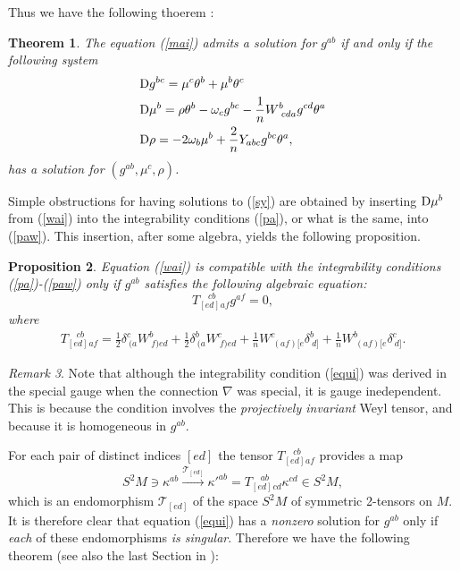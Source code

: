 \documentclass[letterpaper]{amsart}
\newtheorem{theorem}{Theorem}[section]
\newtheorem{proposition}[theorem]{Proposition}
\theoremstyle{definition}
\theoremstyle{remark}
\newtheorem{remark}[theorem]{Remark}
\newcommand{\be}{\begin{equation}}
\newcommand{\ee}{\end{equation}}
\newcommand{\D}{{\rm D}}
\begin{document}
Thus we have the following thoerem \cite{ema}:
\begin{theorem}\label{sto}
The equation (\ref{mai}) admits a solution for $g^{ab}$ if and
only if the following system
\be\begin{aligned}
&\D g^{bc}=\mu^c\theta^b+\mu^b\theta^c\\
&\D\mu^b=\rho\theta^b-\omega_cg^{bc}-\frac{1}{n}W^b_{~cda}g^{cd}\theta^a\\
&\D\rho=-2\omega_b\mu^b+\frac{2}{n}Y_{abc}g^{bc}\theta^a,
\end{aligned}\label{sy}
\ee
has a solution for $(g^{ab},\mu^c,\rho)$. 
\end{theorem}
Simple obstructions for having solutions to (\ref{sy}) are obtained by
inserting $\D\mu^b$ from (\ref{wai}) into the integrability conditions
(\ref{pa}), or what is the same, into (\ref{paw}). This insertion, after some algebra,
yields the following proposition.
\begin{proposition}\label{sto1}
Equation (\ref{wai}) is compatible with the integrability conditions
(\ref{pa})-(\ref{paw}) only if $g^{ab}$ satisfies the following
\emph{algebraic} equation:
\be
T_{[ed]}^{\quad cb}\phantom{}_{af}g^{af}=0,\label{equi}\ee
where 
\be\begin{aligned}
T_{[ed]}^{\quad cb}\phantom{}_{af}=\tfrac12 \delta^c_{~(a}W^b_{~f)ed}+\tfrac12 \delta^b_{~(a}W^c_{~f)ed}+\tfrac{1}{n}W^c_{~(af)[e}\delta^b_{~d]}+\tfrac{1}{n}W^b_{~(af)[e}\delta^c_{~d]}.
\end{aligned}\label{equiv}\ee  
\end{proposition}
\begin{remark}\label{lpo}
Note that although the integrability condition (\ref{equi}) was
derived in the special gauge when the connection $\nabla$ was special,
it is gauge inedependent. This is because the condition involves the
\emph{projectively invariant} Weyl tensor, and because it is homogeneous in
$g^{ab}$.   
\end{remark}
For each pair of distinct indices $[ed]$ the tensor $T_{[ed]}^{\quad cb}\phantom{}_{af}$ provides a map
\be
S^2M\ni \kappa^{ab}\stackrel{{\mathcal T}_{[ed]}}{\longrightarrow} \kappa'^{ab}=T_{[ed]}^{\quad
  ab}\phantom{}_{cd}\kappa^{cd}\in S^2M,\label{mct}\ee
which is an endomorphism ${\mathcal T}_{[ed]}$ of the space $S^2M$ of 
symmetric 2-tensors on $M$. It is therefore clear that equation (\ref{equi})
has a \emph{nonzero} solution for $g^{ab}$ only if \emph{each} of these
endomorphisms \emph{is singular}. Therefore we have the following
theorem (see also the last Section in \cite{bde}):
\end{document}
